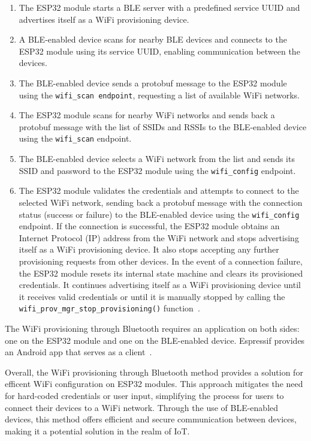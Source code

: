 \begin{enumerate}
  \item The ESP32 module starts a BLE server with a predefined service UUID and advertises itself as a WiFi provisioning device.
  \item A BLE-enabled device scans for nearby BLE devices and connects to the ESP32 module using its service UUID, enabling communication between the devices.
  \item The BLE-enabled device sends a protobuf message to the ESP32 module using the \texttt{wifi\_scan endpoint}, requesting a list of available WiFi networks.
  \item The ESP32 module scans for nearby WiFi networks and sends back a protobuf message with the list of SSIDs and RSSIs to the BLE-enabled device using the \texttt{wifi\_scan} endpoint.
  \item The BLE-enabled device selects a WiFi network from the list and sends its SSID and password to the ESP32 module using the \texttt{wifi\_config} endpoint.
  \item The ESP32 module validates the credentials and attempts to connect to the selected WiFi network, sending back a protobuf message with the connection status (success or failure) to the BLE-enabled device using the \texttt{wifi\_config} endpoint. If the connection is successful, the ESP32 module obtains an Internet Protocol (IP) address from the WiFi network and stops advertising itself as a WiFi provisioning device. It also stops accepting any further provisioning requests from other devices. In the event of a connection failure, the ESP32 module resets its internal state machine and clears its provisioned credentials. It continues advertising itself as a WiFi provisioning device until it receives valid credentials or until it is manually stopped by calling the \texttt{wifi\_prov\_mgr\_stop\_provisioning()} function~\cite{espressif:esp-idf-programming-guide}.
\end{enumerate}

The WiFi provisioning through Bluetooth requires an application on both sides: one on the ESP32 module and one on the BLE-enabled device. Espressif provides an Android app that serves as a client~\cite{google-play:esp-ble-provisioning}.

Overall, the WiFi provisioning through Bluetooth method provides a solution for efficent WiFi configuration on ESP32 modules. This approach mitigates the need for hard-coded credentials or user input, simplifying the process for users to connect their devices to a WiFi network. Through the use of BLE-enabled devices, this method offers efficient and secure communication between devices, making it a potential solution in the realm of IoT.

